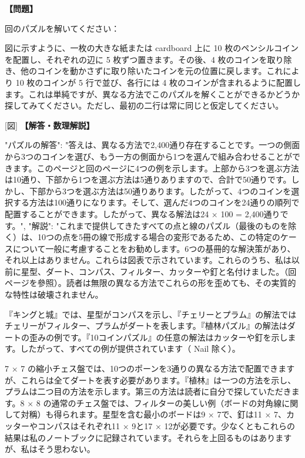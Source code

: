 \documentclass[10pt,a4paper,oneside,openany]{ltjsbook}
\begin{document}
\begin{tcolorbox}[colback=softblue,colframe=primaryblue,title=\textbf{第 210 問：THE TEN COINS.},arc=2mm,boxrule=1pt,breakable]
\textbf{【問題】}\par\vspace{0.3em}
回のパズルを解いてください：

図に示すように、一枚の大きな紙または cardboard 上に 10 枚のペンシルコインを配置し、それぞれの辺に 5 枚ずつ置きます。その後、4 枚のコインを取り除き、他のコインを動かさずに取り除いたコインを元の位置に戻します。これにより 10 枚のコインが 5 行で並び、各行には 4 枚のコインが含まれるように配置します。これは単純ですが、異なる方法でこのパズルを解くことができるかどうか探してみてください。ただし、最初の二行は常に同じと仮定してください。

[図]
\tcblower
\textbf{【解答・数理解説】}\par\vspace{0.3em}
{
"パズルの解答": "答えは、異なる方法で2,400通り存在することです。一つの側面から3つのコインを選び、もう一方の側面から1つを選んで組み合わせることができます。このページと回のページに4つの例を示します。上部から3つを選ぶ方法は10通り、下部から1つを選ぶ方法は5通りありますので、合計で50通りです。しかし、下部から3つを選ぶ方法は50通りあります。したがって、4つのコインを選択する方法は100通りになります。そして、選んだ4つのコインを24通りの順列で配置することができます。したがって、異なる解法は24 × 100 = 2,400通りです。",
"解説": "これまで提供してきたすべての点と線のパズル（最後のものを除く）は、10つの点を5冊の線で形成する場合の変形であるため、この特定のケースについて一般に考慮することをお勧めします。6つの基冊的な解決策があり、それ以上はありません。これらは図表で示されています。これらのうち、私は以前に星型、ダート、コンパス、フィルター、カッターや釘と名付けました。（回ページを參照）。読者は無限の異なる方法でこれらの形を歪めても、その実質的な特性は破壊されません。

『キングと城』では、星型がコンパスを示し、『チェリーとプラム』の解法ではチェリーがフィルター、プラムがダートを表します。『植林パズル』の解法はダートの歪みの例です。『10コインパズル』の任意の解法はカッターや釘を示します。したがって、すべての例が提供されています（ Nail 除く）。

7 × 7 の縮小チェス盤では、10つのポーンを3通りの異なる方法で配置できますが、これらは全てダートを表す必要があります。『植林』は一つの方法を示し、プラムは二つ目の方法を示します。第三の方法は読者に自分で探していただきます。8 × 8 の通常のチェス盤では、フィルターの美しい例（ボードの対角線に関して対稱）も得られます。星型を含む最小のボードは9 × 7で、釘は11 × 7、カッターやコンパスはそれぞれ11 × 9と17 × 12が必要です。少なくともこれらの結果は私のノートブックに記録されています。それらを上回るものはありますが、私はそう思わない。

}
\end{tcolorbox}
\end{document}
